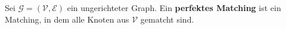 \begin{definition}\label{def:perfect-matching}
Sei $\mathcal{G} = (\mathcal{V}, \mathcal{E})$ ein ungerichteter Graph. Ein \textbf{perfektes Matching} 
 ist ein Matching, in dem alle Knoten aus $\mathcal{V}$ gematcht sind.\textnormal{\cite[S.~735, Übung]{cormen:matchings}}
\end{definition}
